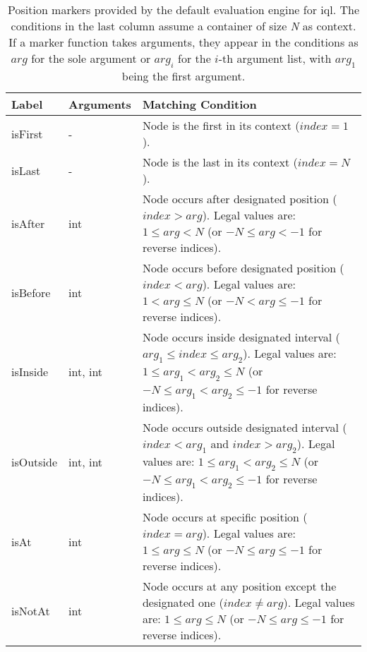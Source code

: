 \documentclass[11pt,a4paper]{report}
\begin{document}
\begin{table}[ht]\centering
\begin{tabular}{|p{}|p{}|p{}|}
	\hline 
	\textbf{Label} & \textbf{Arguments} & \textbf{Matching Condition} \\ 
	\hline 
	\hline  
	isFirst & - & Node is the first in its context ($index = 1$). \\ 
	\hline 
	isLast & - & Node is the last in its context ($index = N$). \\  
	\hline 
	isAfter & int & Node occurs after designated position ($index > arg$). Legal values are: $1 \leq arg < N$ (or $-N \leq arg < -1$ for reverse indices). \\  
	\hline 
	isBefore & int & Node occurs before designated position ($index < arg$). Legal values are: $1 < arg \leq N$ (or $-N < arg \leq -1$ for reverse indices). \\  
	\hline 
	isInside & int, int & Node occurs inside designated interval ($arg_1 \leq index \leq arg_2$). Legal values are: $1 \leq arg_1 < arg_2 \leq N$ (or $-N \leq arg_1 < arg_2 \leq -1$ for reverse indices). \\  
	\hline 
	isOutside & int, int & Node occurs outside designated interval ($index < arg_1$ and $index>arg_2$). Legal values are: $1 \leq arg_1 < arg_2 \leq N$ (or $-N \leq arg_1 < arg_2 \leq -1$ for reverse indices). \\  
	\hline 
	isAt & int & Node occurs at specific position ($index = arg$). Legal values are: $1 \leq arg \leq N$ (or $-N \leq arg \leq -1$ for reverse indices). \\  
	\hline 
	isNotAt & int & Node occurs at any position except the designated one ($index \neq arg$). Legal values are: $1 \leq arg \leq N$ (or $-N \leq arg \leq -1$ for reverse indices). \\  
	\hline 
\end{tabular}
\caption[Global position markers]{Position markers provided by the default evaluation engine for \ac{iql}. The conditions in the last column assume a container of size \textit{N} as context. If a marker function takes arguments, they appear in the conditions as $arg$ for the sole argument or $arg_i$ for the $i$-th argument list, with $arg_1$ being the first argument.}
\label{tab:position-markers}
\end{table} 
\end{document}
